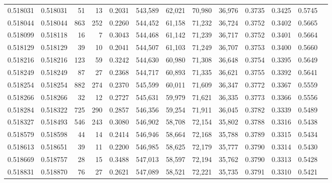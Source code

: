 \begin{tabular}{rrrrrrrrrrrrr}
0.518031 & 0.518031 &    51 &    13 &                                     0.2031 & 543,589 &  62,021 &  70,980 &  36,976 & 0.3735 & 0.3425 & 0.5745 \\
0.518044 & 0.518044 &   863 &   252 &                                     0.2260 & 544,452 &  61,158 &  71,232 &  36,724 & 0.3752 & 0.3402 & 0.5665 \\
0.518099 & 0.518118 &    16 &     7 &                                     0.3043 & 544,468 &  61,142 &  71,239 &  36,717 & 0.3752 & 0.3401 & 0.5664 \\
0.518129 & 0.518129 &    39 &    10 &                                     0.2041 & 544,507 &  61,103 &  71,249 &  36,707 & 0.3753 & 0.3400 & 0.5660 \\
0.518216 & 0.518216 &   123 &    59 &                                     0.3242 & 544,630 &  60,980 &  71,308 &  36,648 & 0.3754 & 0.3395 & 0.5649 \\
0.518249 & 0.518249 &    87 &    27 &                                     0.2368 & 544,717 &  60,893 &  71,335 &  36,621 & 0.3755 & 0.3392 & 0.5641 \\
0.518254 & 0.518254 &   882 &   274 &                                     0.2370 & 545,599 &  60,011 &  71,609 &  36,347 & 0.3772 & 0.3367 & 0.5559 \\
0.518266 & 0.518266 &    32 &    12 &                                     0.2727 & 545,631 &  59,979 &  71,621 &  36,335 & 0.3773 & 0.3366 & 0.5556 \\
0.518284 & 0.518322 &   725 &   290 &                                     0.2857 & 546,356 &  59,254 &  71,911 &  36,045 & 0.3782 & 0.3339 & 0.5489 \\
0.518327 & 0.518493 &   546 &   243 &                                     0.3080 & 546,902 &  58,708 &  72,154 &  35,802 & 0.3788 & 0.3316 & 0.5438 \\
0.518579 & 0.518598 &    44 &    14 &                                     0.2414 & 546,946 &  58,664 &  72,168 &  35,788 & 0.3789 & 0.3315 & 0.5434 \\
0.518613 & 0.518651 &    39 &    11 &                                     0.2200 & 546,985 &  58,625 &  72,179 &  35,777 & 0.3790 & 0.3314 & 0.5430 \\
0.518669 & 0.518757 &    28 &    15 &                                     0.3488 & 547,013 &  58,597 &  72,194 &  35,762 & 0.3790 & 0.3313 & 0.5428 \\
0.518831 & 0.518870 &    76 &    27 &                                     0.2621 & 547,089 &  58,521 &  72,221 &  35,735 & 0.3791 & 0.3310 & 0.5421 \\

\end{tabular}

